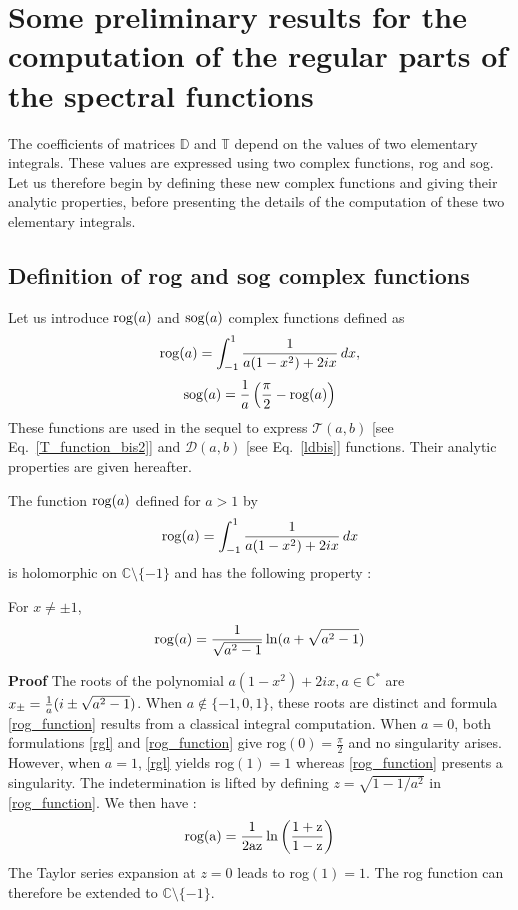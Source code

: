 \chapter[][Some preliminary results]{Some preliminary results for the computation of the regular parts of the spectral functions }
\label{Intégrale}

The coefficients of matrices $\mathbb{D}$ and $\mathbb{T}$ depend on the values of two elementary integrals. These values are expressed using two complex functions, rog and sog. Let us therefore begin by defining these new complex functions and giving their analytic properties, before presenting the details of the computation of these two elementary integrals.

\section{Definition of rog and sog complex functions}
\label{rogsog}
Let us introduce ${\rm rog}(a)$ and ${\rm sog}(a)$ complex functions defined as
\begin{equation}
\label{defrog}
{\rm rog}(a) =\int_{-1}^1 {1 \over a(1-x^2)+2ix} \, dx,
\end{equation}
\begin{equation}
\label{defsog}
{\rm sog}(a) = \dfrac{1}{a}\left( \dfrac{\pi}{2} - {\rm rog}(a)\right)
\end{equation}
These functions are used in the sequel to express $\mathcal{T}(a,b)$ [see Eq.~\eqref{T_function_bis2}] and $\mathcal{D}(a,b)$ [see Eq.~\eqref{ldbis}] functions. Their analytic properties are given hereafter.

\begin{lemma}
\label{lemma_rog}
The function ${\rm rog}(a)$ defined for $a > 1$ by
\begin{equation*}
 {\rm rog}(a)=\int_{-1}^1 {1 \over a(1-x^2)+2ix} \, dx
\end{equation*}
is holomorphic on $\mathbb C\setminus \{-1\}$ and has the following property : 

For $x\neq \pm 1$,
\begin{equation}
{\rm rog}(a) = \dfrac{1}{\sqrt{a^2 - 1}} \ln (a+\sqrt{a^2 -1})
\label{rog_function}
\end{equation}
\end{lemma}


{\bf Proof}
The roots of the polynomial $a(1-x^2)+2ix, a\in \mathbb C^* $ are $x_\pm={1\over a}(i\pm \sqrt {a^2-1})$. When $a \notin \{ -1,0,1\} $, these roots are distinct and  formula \eqref{rog_function} results from a classical integral computation. When $a=0$, both formulations \eqref{rgl} and \eqref{rog_function} give rog$(0)=\frac{\pi}{2}$ and no singularity arises. However, when $a=1$, \eqref{rgl} yields rog$(1)=1$ whereas \eqref{rog_function} presents a singularity. The indetermination is lifted by defining $z=\sqrt{1-1/a^2}$ in \eqref{rog_function}. We then have :
\begin{equation}
\rm rog(a)=\frac{1}{2az}\ln \left(\frac{1+z}{1-z}\right)
\end{equation}
The Taylor series expansion at $z=0$ leads to rog$(1)=1$. The rog function can therefore be extended to $\mathbb{C}\setminus \{-1\}$.


